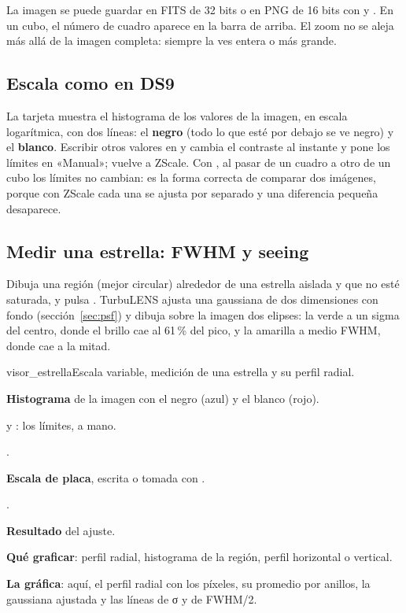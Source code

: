 La imagen se puede guardar en FITS de 32 bits o en PNG de 16 bits con  y . En
un cubo, el número de cuadro aparece en la barra de arriba. El zoom no se aleja más allá de la imagen completa: siempre
la ves entera o más grande.

\subsection{Escala como en DS9}

La tarjeta  muestra el histograma de los valores de la imagen, en escala logarítmica, con dos
líneas: el \textbf{negro} (todo lo que esté por debajo se ve negro) y el \textbf{blanco}. Escribir otros valores en
 y  cambia el contraste al instante y pone los límites en «Manual»;  vuelve
a ZScale. Con , al pasar de un cuadro a otro de un cubo los límites no cambian:
es la forma correcta de comparar dos imágenes, porque con ZScale cada una se ajusta por separado y una diferencia pequeña
desaparece.

\subsection{Medir una estrella: FWHM y seeing}\label{sec:fwhm_app}

Dibuja una región (mejor circular) alrededor de una estrella aislada y que no esté saturada, y pulsa
. TurbuLENS ajusta una gaussiana de dos dimensiones con fondo
(sección~\ref{sec:psf}) y dibuja sobre la imagen dos elipses: la verde a un sigma del centro, donde el brillo cae al
61\,\% del pico, y la amarilla a medio FWHM, donde cae a la mitad.

\begin{capturam}{visor_estrella}{Escala variable, medición de una estrella y su perfil radial.}
\item \textbf{Histograma} de la imagen con el negro (azul) y el blanco (rojo).
\item {} y : los límites, a mano.
\item {}.
\item \textbf{Escala de placa}, escrita o tomada con .
\item {}.
\item \textbf{Resultado} del ajuste.
\item \textbf{Qué graficar}: perfil radial, histograma de la región, perfil horizontal o vertical.
\item \textbf{La gráfica}: aquí, el perfil radial con los píxeles, su promedio por anillos, la gaussiana ajustada y las
líneas de σ y de FWHM/2.
\end{capturam}

